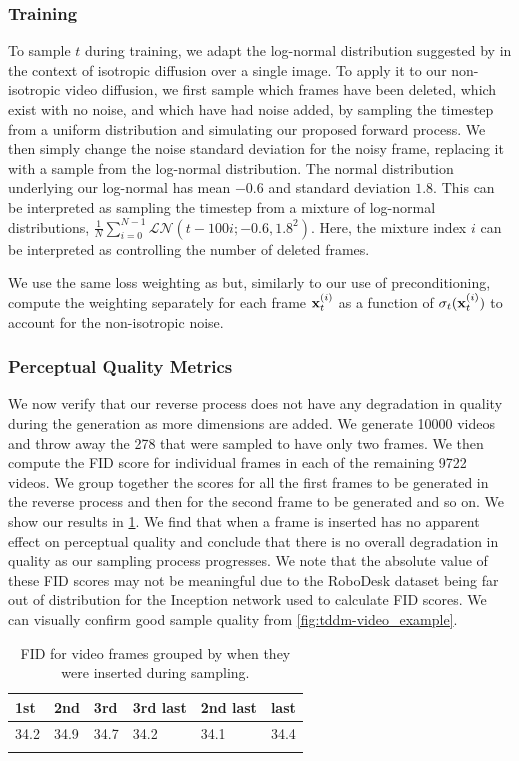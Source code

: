 \subsubsection{Training}
To sample $t$ during training, we adapt the log-normal distribution suggested by \cite{karras2022elucidating} in the context of isotropic diffusion over a single image. To apply it to our non-isotropic video diffusion, we first sample which frames have been deleted, which exist with no noise, and which have had noise added, by sampling the timestep from a uniform distribution and simulating our proposed forward process. We then simply change the noise standard deviation for the noisy frame, replacing it with a sample from the log-normal distribution. The normal distribution underlying our log-normal has mean $-0.6$ and standard deviation $1.8$. 
%
This can be interpreted as sampling the timestep from a mixture of log-normal distributions, $\frac{1}{N}\sum_{i=0}^{N-1} \mathcal{LN}(t-100i; -0.6, 1.8^2)$. Here, the mixture index $i$ can be interpreted as controlling the number of deleted frames.

We use the same loss weighting as \cite{karras2022elucidating} but, similarly to our use of preconditioning, compute the weighting separately for each frame ${\mathbf{x}}_t^{(i)}$ as a function of $\sigma_t({\mathbf{x}}_t^{(i)})$ to account for the non-isotropic noise.

\subsubsection{Perceptual Quality Metrics}
We now verify that our reverse process does not have any degradation in quality during the generation as more dimensions are added. We generate 10000 videos and throw away the 278 that were sampled to have only two frames. We then compute the FID score for individual frames in each of the remaining 9722 videos. We group together the scores for all the first frames to be generated in the reverse process and then for the second frame to be generated and so on. We show our results in \cref{tab:fid-by-insertion-order}. We find that when a frame is inserted has no apparent effect on perceptual quality and conclude that there is no overall degradation in quality as our sampling process progresses. We note that the absolute value of these FID scores may not be meaningful due to the RoboDesk dataset being far out of distribution for the Inception network used to calculate FID scores. We can visually confirm good sample quality from \cref{fig:tddm-video_example}.
\begin{table}[h]
\centering
\caption{FID for video frames grouped by when they were inserted during sampling.}
\begin{tabular}{p{1.5cm}p{1.5cm}p{1.5cm}|p{1.5cm}p{1.5cm}p{1.5cm}}
\toprule
1st & 2nd & 3rd & 3rd last & 2nd last & last \\
\midrule
34.2 & 34.9 & 34.7 & 34.2 & 34.1 & 34.4 \\
\bottomrule
\label{tab:fid-by-insertion-order}
\end{tabular}
\end{table}